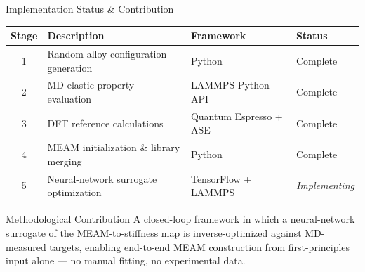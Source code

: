 \documentclass[aspectratio=169, 11pt]{beamer}
\begin{document}
\begin{frame}{Implementation Status \& Contribution}
\centering
\small
\begin{tabular}{clll}
\toprule
\textbf{Stage} & \textbf{Description} & \textbf{Framework} & \textbf{Status} \\
\midrule
1 & Random alloy configuration generation   & Python                  & Complete \\
2 & MD elastic-property evaluation          & LAMMPS Python API       & Complete \\
3 & DFT reference calculations              & Quantum Espresso + ASE  & Complete \\
4 & MEAM initialization \& library merging  & Python                  & Complete \\
5 & Neural-network surrogate optimization   & TensorFlow + LAMMPS     & \emph{Implementing} \\
\bottomrule
\end{tabular}

\vspace{1em}
\begin{block}{Methodological Contribution}
A closed-loop framework in which a neural-network surrogate of the MEAM-to-stiffness map is inverse-optimized against MD-measured targets, enabling end-to-end MEAM construction from first-principles input alone --- no manual fitting, no experimental data.
\end{block}
\let\thefootnote\relax{}
\end{frame}
\end{document}
